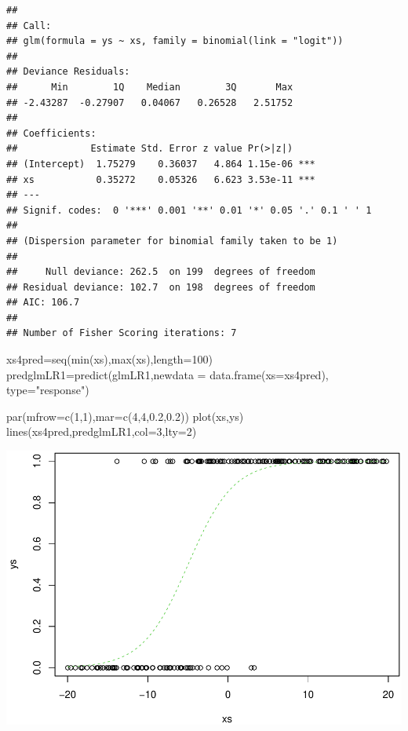 \documentclass[
]{book}
\newenvironment{Shaded}{\begin{snugshade}}{\end{snugshade}}
\newcommand{\AttributeTok}[1]{\textcolor[rgb]{0.77,0.63,0.00}{#1}}
\newcommand{\DecValTok}[1]{\textcolor[rgb]{0.00,0.00,0.81}{#1}}
\newcommand{\FloatTok}[1]{\textcolor[rgb]{0.00,0.00,0.81}{#1}}
\newcommand{\FunctionTok}[1]{\textcolor[rgb]{0.00,0.00,0.00}{#1}}
\newcommand{\NormalTok}[1]{#1}
\newcommand{\OtherTok}[1]{\textcolor[rgb]{0.56,0.35,0.01}{#1}}
\newcommand{\StringTok}[1]{\textcolor[rgb]{0.31,0.60,0.02}{#1}}
\begin{document}
\begin{verbatim}
## 
## Call:
## glm(formula = ys ~ xs, family = binomial(link = "logit"))
## 
## Deviance Residuals: 
##      Min        1Q    Median        3Q       Max  
## -2.43287  -0.27907   0.04067   0.26528   2.51752  
## 
## Coefficients:
##             Estimate Std. Error z value Pr(>|z|)    
## (Intercept)  1.75279    0.36037   4.864 1.15e-06 ***
## xs           0.35272    0.05326   6.623 3.53e-11 ***
## ---
## Signif. codes:  0 '***' 0.001 '**' 0.01 '*' 0.05 '.' 0.1 ' ' 1
## 
## (Dispersion parameter for binomial family taken to be 1)
## 
##     Null deviance: 262.5  on 199  degrees of freedom
## Residual deviance: 102.7  on 198  degrees of freedom
## AIC: 106.7
## 
## Number of Fisher Scoring iterations: 7
\end{verbatim}

\begin{Shaded}
\begin{Highlighting}[]
\NormalTok{xs4pred}\OtherTok{=}\FunctionTok{seq}\NormalTok{(}\FunctionTok{min}\NormalTok{(xs),}\FunctionTok{max}\NormalTok{(xs),}\AttributeTok{length=}\DecValTok{100}\NormalTok{)}
\NormalTok{predglmLR1}\OtherTok{=}\FunctionTok{predict}\NormalTok{(glmLR1,}\AttributeTok{newdata =} \FunctionTok{data.frame}\NormalTok{(}\AttributeTok{xs=}\NormalTok{xs4pred),}
\AttributeTok{type=}\StringTok{"response"}\NormalTok{)}

\FunctionTok{par}\NormalTok{(}\AttributeTok{mfrow=}\FunctionTok{c}\NormalTok{(}\DecValTok{1}\NormalTok{,}\DecValTok{1}\NormalTok{),}\AttributeTok{mar=}\FunctionTok{c}\NormalTok{(}\DecValTok{4}\NormalTok{,}\DecValTok{4}\NormalTok{,}\FloatTok{0.2}\NormalTok{,}\FloatTok{0.2}\NormalTok{))}
\FunctionTok{plot}\NormalTok{(xs,ys)}
\FunctionTok{lines}\NormalTok{(xs4pred,predglmLR1,}\AttributeTok{col=}\DecValTok{3}\NormalTok{,}\AttributeTok{lty=}\DecValTok{2}\NormalTok{)}
\end{Highlighting}
\end{Shaded}

\includegraphics{ECOMODbook_files/figure-latex/unnamed-chunk-17-1.pdf}
\end{document}
